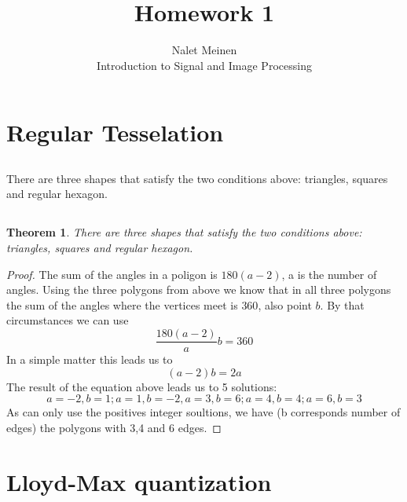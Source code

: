 \documentclass[12pt]{article}
\begin{document}


\title{Homework 1}%
\author{Nalet Meinen\\ %
Introduction to Signal and Image Processing
}

\maketitle

\section{Regular Tesselation}
\subsection{}
  There are three shapes that satisfy the two conditions above: triangles, squares and regular hexagon.
\subsection{}
\newtheorem{thm}{Theorem}
\begin{thm}
  There are three shapes that satisfy the two conditions above: triangles, squares and regular hexagon.
\end{thm}

\begin{proof}
The sum of the angles in a poligon is $180(a-2)$, a is the number of angles. 
Using the three polygons from above we know that in all three polygons the sum of the angles 
where the vertices meet is $360$, also point $b$. By that circumstances we can use
\[ \frac{180(a-2)}{a}b=360 \]
In a simple matter this leads us to
\[ (a-2)b=2a \]
The result of the equation above leads us to 5 solutions: 
\[ a=-2,b=1;a=1,b=-2,a=3,b=6;a=4,b=4;a=6,b=3 \]
As can only use the positives integer soultions, we have (b corresponds number of edges) the polygons
with 3,4 and 6 edges.
\end{proof}
\newpage

\section{Lloyd-Max quantization}
\end{document}
